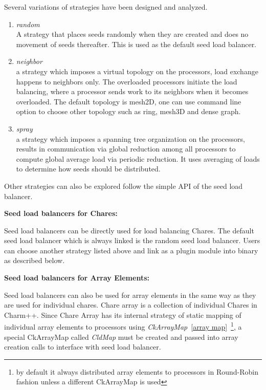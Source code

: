 Several variations of strategies have been designed and analyzed. 
\begin{enumerate}
\item {\em random}\\  
 A strategy that places seeds randomly when they are created and does
no movement of seeds thereafter. This is used as the default seed 
load balancer.
\item {\em neighbor}\\  
 a strategy which imposes a virtual topology on the processors,
 load exchange happens to neighbors only. The overloaded processors
 initiate the load balancing, where a processor sends work to its neighbors
 when it becomes overloaded. The default topology is mesh2D, one can use
 command line option to choose other topology such as ring, mesh3D and 
 dense graph.
\item {\em spray}\\  
 a strategy which imposes a spanning tree organization on the processors,
 results in communication via global reduction among all processors 
 to compute global average load via periodic reduction. 
 It uses averaging of loads to determine how seeds should be
distributed.
\end{enumerate}

Other strategies can also be explored follow the simple API of the 
seed load balancer.
\linebreak

{\bf Seed load balancers for Chares:}

Seed load balancers can be directly used for load balancing Chares.
The default seed load balancer which is always linked is the random seed load balancer.
Users can choose another strategy listed above and link as a plugin
module into binary as described below.

{\bf Seed load balancers for Array Elements:}

Seed load balancers can also be used for array elements in the same way 
as they are used for individual chares.
Chare array is a collection of individual Chares in Charm++.
Since Chare Array has its internal strategy of static mapping of individual
array elements to processors using {\em CkArrayMap}~\ref{array map}~\footnote{by default it always distributed array elements to processors in Round-Robin fashion unless a different CkArrayMap is used}, 
a special CkArrayMap called {\em CldMap} must be created and passed into
array creation calls to interface with seed load balancer.

